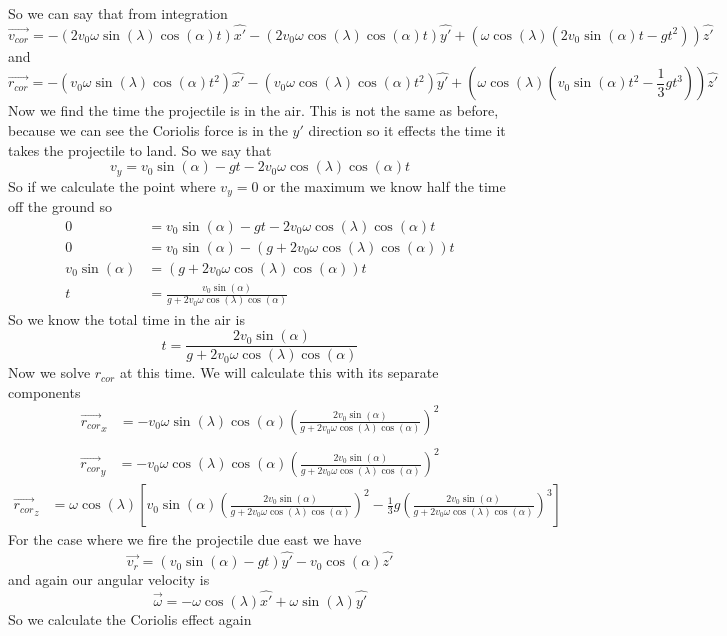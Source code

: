 \documentclass[11pt]{article}
\numberwithin{equation}{section}
\newcommand{\vecomg}{\vec{\omega}}
\begin{document}
So we can say that from integration
$$\vec{v_{cor}}= -(2v_0\omega\sin(\lambda)\cos(\alpha)t)\hat{x'} 
	- (2v_0\omega\cos(\lambda)\cos(\alpha)t)\hat{y'}
	+ (\omega\cos(\lambda)(2v_0\sin(\alpha)t-gt^2))\hat{z'}$$
and 
$$\vec{r_{cor}}= -(v_0\omega\sin(\lambda)\cos(\alpha)t^2)\hat{x'} 
	- (v_0\omega\cos(\lambda)\cos(\alpha)t^2)\hat{y'}
	+ (\omega\cos(\lambda)(v_0\sin(\alpha)t^2-\frac{1}{3}gt^3))\hat{z'}$$
Now we find the time the projectile is in the air. This is not the same as before, because we can see the Coriolis force is in the $y'$ direction so it effects the time it takes the projectile to land. So we say that 
$$v_y = v_0\sin(\alpha)-gt- 2v_0\omega\cos(\lambda)\cos(\alpha)t$$
So if we calculate the point where $v_y=0$ or the maximum we know half the time off the ground so
\begin{align*}
0 &= v_0\sin(\alpha)-gt- 2v_0\omega\cos(\lambda)\cos(\alpha)t\\
0 &= v_0\sin(\alpha) - (g+ 2v_0\omega\cos(\lambda)\cos(\alpha))t\\
v_0\sin(\alpha) &= (g+ 2v_0\omega\cos(\lambda)\cos(\alpha))t\\
t &= \frac{v_0\sin(\alpha)}{g+ 2v_0\omega\cos(\lambda)\cos(\alpha)}
\end{align*}
So we know the total time in the air is 
$$t = \frac{2v_0\sin(\alpha)}{g+ 2v_0\omega\cos(\lambda)\cos(\alpha)}$$
Now we solve $r_{cor}$ at this time. We will calculate this with its separate components 
\begin{align*}
\vec{r_{cor}}_x &= -v_0\omega\sin(\lambda)\cos(\alpha)\left(\frac{2v_0\sin(\alpha)}{g+ 2v_0\omega\cos(\lambda)\cos(\alpha)}\right)^2 \\
\end{align*}
\begin{align*}
\vec{r_{cor}}_y &= -v_0\omega\cos(\lambda)\cos(\alpha)\left(\frac{2v_0\sin(\alpha)}{g+ 2v_0\omega\cos(\lambda)\cos(\alpha)}\right)^2
\end{align*}
\begin{align*}
\vec{r_{cor}}_z &= \omega\cos(\lambda)\left[v_0\sin(\alpha)\left(\frac{2v_0\sin(\alpha)}{g+ 2v_0\omega\cos(\lambda)\cos(\alpha)}\right)^2-\frac{1}{3}g\left(\frac{2v_0\sin(\alpha)}{g+ 2v_0\omega\cos(\lambda)\cos(\alpha)}\right)^3\right]
\end{align*}
For the case where we fire the projectile due east we have 
$$\vec{v_r} = (v_0\sin(\alpha)-gt)\hat{y'}-v_0\cos(\alpha)\hat{z'}$$
and again our angular velocity is
$$\vecomg = -\omega\cos(\lambda)\hat{x'} + \omega\sin(\lambda)\hat{y'}$$
So we calculate the Coriolis effect again
\end{document}
